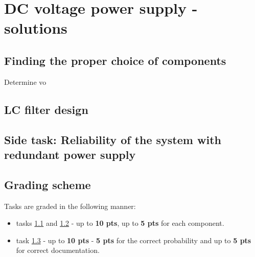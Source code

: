 \documentclass[a4paper]{article}
\begin{document}
\section{DC voltage power supply - solutions}

\subsection{Finding the proper choice of components}
\label{ele:task:1}

Determine vo

\subsection{LC filter design}
\label{ele:task:2}

\subsection{Side task: Reliability of the system with redundant power supply} 
\label{ele:task:3}

\subsection{Grading scheme}
Tasks are graded in the following manner:
\begin{itemize}
\item tasks \ref{ele:task:1} and \ref{ele:task:2} - up to \textbf{10 pts}, 
up to \textbf{5 pts} for each component.
\item task \ref{ele:task:3} - up to \textbf{10 pts} - \textbf{5 pts} for the 
correct probability and up to \textbf{5 pts} for correct documentation.
\end{itemize}

 
\end{document}
